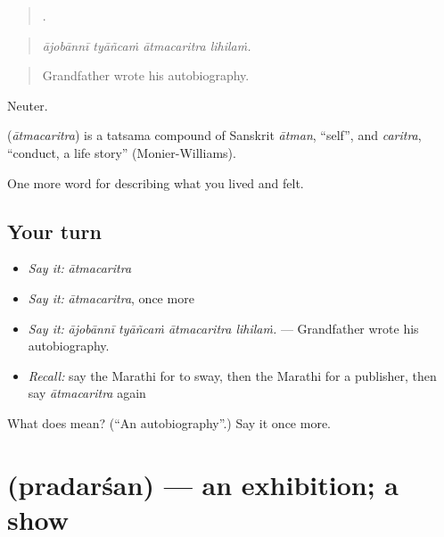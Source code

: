 \begin{quote}
   .
\end{quote}

\begin{quote}
\emph{ājobānnī tyāñcaṁ ātmacaritra lihilaṁ.}
\end{quote}

\begin{quote}
Grandfather wrote his autobiography.
\end{quote}

Neuter.

\begin{cousinweb}
\textbf{} (\emph{ātmacaritra}) is a tatsama compound of Sanskrit \emph{ātman}, \textquotedblleft{}self\textquotedblright{}, and \emph{caritra}, \textquotedblleft{}conduct, a life story\textquotedblright{} (Monier-Williams).
\end{cousinweb}

\begin{grammarlens}[title={What you've built}]
One more word for describing what you lived and felt.
\end{grammarlens}

\subsection*{Your turn}
\begin{itemize}
\raggedright
  \item \emph{Say it:} \emph{ātmacaritra}
  \item \emph{Say it:} \emph{ātmacaritra}, once more
  \item \emph{Say it:} \emph{ājobānnī tyāñcaṁ ātmacaritra lihilaṁ.} — Grandfather wrote his autobiography.
  \item \emph{Recall:} say the Marathi for to sway, then the Marathi for a publisher, then say \emph{ātmacaritra} again
\end{itemize}

\begin{tcolorbox}[breakable,colback=teal!4,colframe=teal!35!black,title={Before you move on}]
What does  mean? (\textquotedblleft{}An autobiography\textquotedblright{}.) Say it once more.
\end{tcolorbox}
\section[\texorpdfstring{\mr{प्रदर्शन} (pradarśan)}{प्रदर्शन (pradarśan)}]{ (pradarśan) — an exhibition; a show}

